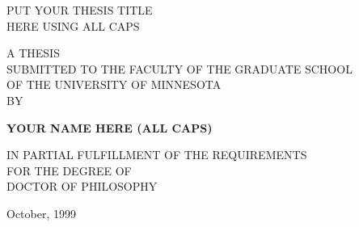 
\begin{center}
{\large PUT YOUR THESIS TITLE \\
HERE USING ALL CAPS}

\vspace*{1in}
A THESIS \\
SUBMITTED TO THE FACULTY OF THE GRADUATE SCHOOL \\
OF THE UNIVERSITY OF MINNESOTA \\
BY

\vspace*{.75in}

{\bf YOUR NAME HERE (ALL CAPS)}

\vspace*{.75in}
IN PARTIAL FULFILLMENT OF THE REQUIREMENTS \\ 
FOR THE DEGREE OF \\
DOCTOR OF PHILOSOPHY
 
\vspace*{1in}
 October, 1999

\end{center}

